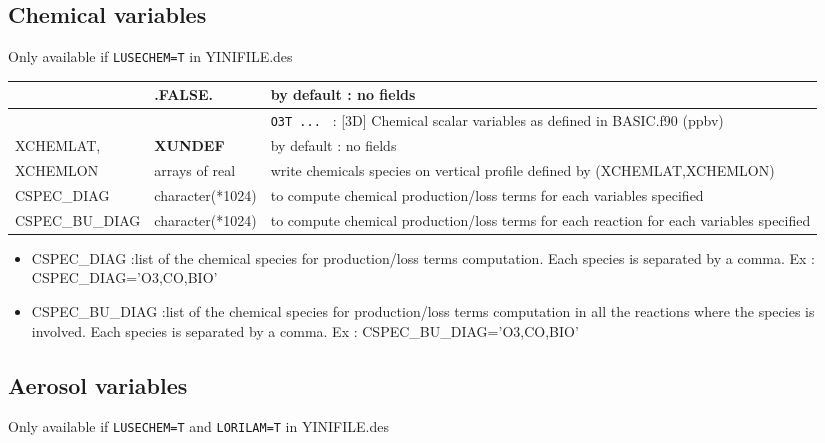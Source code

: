 \subsection{Chemical variables}
Only available if \verb|LUSECHEM=T| in YINIFILE.des
\begin{center}
\begin{tabular}{|>{\centering}p{3cm}|>{\centering}p{2.5cm}|p{11cm}|}
\hline
\multirow{3}{*}{LCHEMDIAG}\index{LCHEMDIAG!\innam{NAM\_DIAG}}&\textbf{.FALSE.}&  by default : no fields\\\cline{2-3}
& \multirow{2}{*}{.TRUE.}&{\tt O3T ... } : [3D] Chemical scalar variables as defined in BASIC.f90 (ppbv)\\ \hline
XCHEMLAT,&\textbf{XUNDEF}&  by default : no fields\\\cline{2-3}
XCHEMLON&arrays of real & write chemicals species on vertical profile defined by (XCHEMLAT,XCHEMLON)\\ \hline
CSPEC\_DIAG&character(*1024) &  to compute chemical production/loss terms for each variables specified\\ \hline
CSPEC\_BU\_DIAG&character(*1024) & to compute chemical production/loss terms for each reaction for each variables specified \\ \hline
\end{tabular}
\end{center}
\begin{itemize}
\item CSPEC\_DIAG :list of the chemical species for production/loss terms computation. Each species is separated by a comma. Ex : CSPEC\_DIAG='O3,CO,BIO'
\item CSPEC\_BU\_DIAG  :list of the chemical species for production/loss terms computation in all the reactions where the species is involved.  Each species is separated by a comma. Ex : CSPEC\_BU\_DIAG='O3,CO,BIO'

\end{itemize}

\subsection{Aerosol variables}
Only available if \verb|LUSECHEM=T| and  \verb|LORILAM=T| in YINIFILE.des

